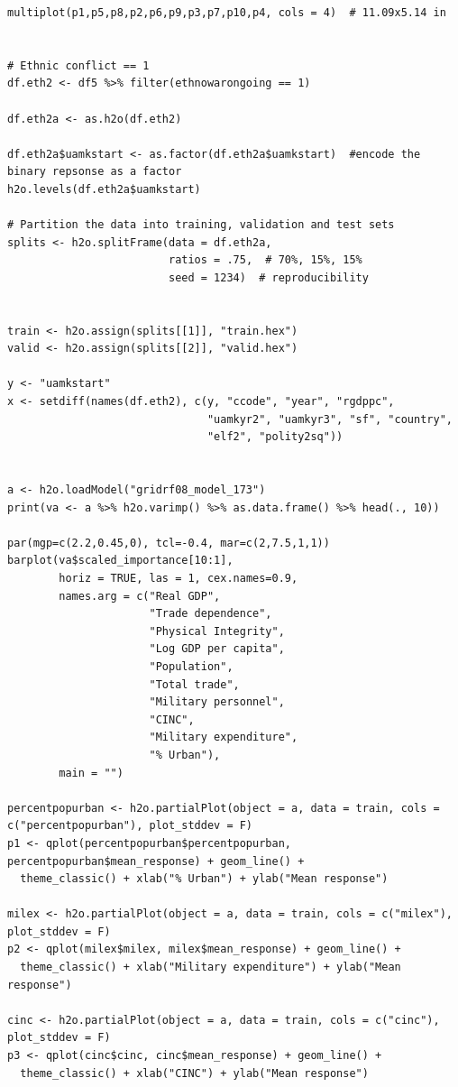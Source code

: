 \begin{verbatim}
multiplot(p1,p5,p8,p2,p6,p9,p3,p7,p10,p4, cols = 4)  # 11.09x5.14 in


# Ethnic conflict == 1
df.eth2 <- df5 %>% filter(ethnowarongoing == 1)

df.eth2a <- as.h2o(df.eth2)

df.eth2a$uamkstart <- as.factor(df.eth2a$uamkstart)  #encode the binary repsonse as a factor
h2o.levels(df.eth2a$uamkstart)

# Partition the data into training, validation and test sets
splits <- h2o.splitFrame(data = df.eth2a, 
                         ratios = .75,  # 70%, 15%, 15%
                         seed = 1234)  # reproducibility


train <- h2o.assign(splits[[1]], "train.hex")   
valid <- h2o.assign(splits[[2]], "valid.hex") 

y <- "uamkstart"
x <- setdiff(names(df.eth2), c(y, "ccode", "year", "rgdppc",
                               "uamkyr2", "uamkyr3", "sf", "country",
                               "elf2", "polity2sq")) 


a <- h2o.loadModel("gridrf08_model_173")
print(va <- a %>% h2o.varimp() %>% as.data.frame() %>% head(., 10)) 

par(mgp=c(2.2,0.45,0), tcl=-0.4, mar=c(2,7.5,1,1))
barplot(va$scaled_importance[10:1],
        horiz = TRUE, las = 1, cex.names=0.9,
        names.arg = c("Real GDP",
                      "Trade dependence",
                      "Physical Integrity",
                      "Log GDP per capita",
                      "Population",
                      "Total trade",
                      "Military personnel", 
                      "CINC",
                      "Military expenditure",
                      "% Urban"),
        main = "")

percentpopurban <- h2o.partialPlot(object = a, data = train, cols = c("percentpopurban"), plot_stddev = F)
p1 <- qplot(percentpopurban$percentpopurban, percentpopurban$mean_response) + geom_line() +
  theme_classic() + xlab("% Urban") + ylab("Mean response")

milex <- h2o.partialPlot(object = a, data = train, cols = c("milex"), plot_stddev = F)
p2 <- qplot(milex$milex, milex$mean_response) + geom_line() +
  theme_classic() + xlab("Military expenditure") + ylab("Mean response")

cinc <- h2o.partialPlot(object = a, data = train, cols = c("cinc"), plot_stddev = F)
p3 <- qplot(cinc$cinc, cinc$mean_response) + geom_line() +
  theme_classic() + xlab("CINC") + ylab("Mean response")


\end{verbatim}
